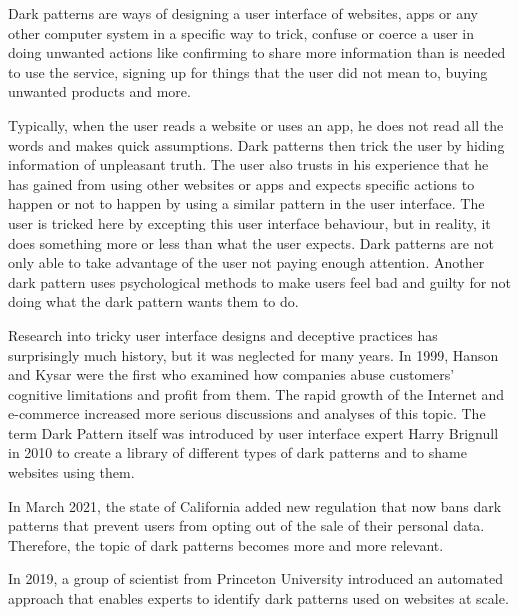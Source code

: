 Dark patterns\cite{dark-patterns-brignull, dark-patterns-colin, the-year-dark-pattern-won, dark-patterns-at-scale} are ways of designing a user interface of websites, apps or any other computer system in a specific way to trick, confuse or coerce a user in doing unwanted actions like confirming to share more information than is needed to use the service, signing up for things that the user did not mean to, buying unwanted products and more. 

Typically, when the user reads a website or uses an app, he does not read all the words and makes quick assumptions\cite{dark-patterns-brignull}. Dark patterns then trick the user by hiding information of unpleasant truth. The user also trusts in his experience that he has gained from using other websites or apps and expects specific actions to happen or not to happen by using a similar pattern in the user interface. The user is tricked here by excepting this user interface behaviour, but in reality, it does something more or less than what the user expects\cite{the-year-dark-pattern-won}. Dark patterns are not only able to take advantage of the user not paying enough attention. Another dark pattern uses psychological methods to make users feel bad and guilty for not doing what the dark pattern wants them to do\cite{the-year-dark-pattern-won}.

Research into tricky user interface designs and deceptive practices has surprisingly much history, but it was neglected for many years. In 1999, Hanson and Kysar were the first who examined how companies abuse customers' cognitive limitations and profit from them. The rapid growth of the Internet and e-commerce increased more serious discussions and analyses of this topic. The term Dark Pattern itself was introduced by user interface expert Harry Brignull in 2010 to create a library of different types of dark patterns and to shame websites using them\cite{dark-patterns-brignull-about-us}. 

In March 2021, the state of California added new regulation that now bans dark patterns that prevent users from opting out of the sale of their personal data\cite{california-bans-dark-patterns}. Therefore, the topic of dark patterns becomes more and more relevant.

In 2019, a group of scientist from Princeton University introduced an automated approach that enables experts to identify dark patterns used on websites at scale\cite{dark-patterns-at-scale}. 

